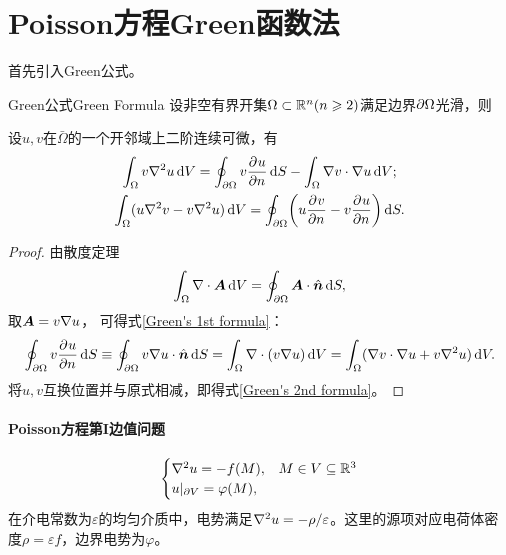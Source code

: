 \section{Poisson方程Green函数法}
首先引入Green公式。
\begin{theorem}{Green公式}{Green Formula}
	设非空有界开集$\Omega \subset \mathbb{R}^n(n \geqslant 2)$满足边界$\partial\Omega$光滑，则
	
	设$u,v$在$\bar\Omega$的一个开邻域上二阶连续可微，有
	\begin{gather}
		\label{Green's 1st formula}
		\int_\Omega v\nabla^2 u\mathop{}\!\mathrm{d} V = \oint_{\partial\Omega}v\frac{\partial^{}u}{\partial{n}^{}}\mathop{}\!\mathrm{d} S - \int_\Omega\nabla v \cdot \nabla u\mathop{}\!\mathrm{d} V;\\
		\label{Green's 2nd formula}
		\int_\Omega(u\nabla^2 v - v\nabla^2 u)\mathop{}\!\mathrm{d} V = \oint_{\partial\Omega}\biggl(u\frac{\partial^{}v}{\partial{n}^{}} - v\frac{\partial^{}u}{\partial{n}^{}}\biggr)\mathop{}\!\mathrm{d} S.
	\end{gather}
\end{theorem}
\begin{proof}
	由散度定理
	\begin{align*}
		\int_\Omega\nabla\cdot\bm A\mathop{}\!\mathrm{d} V = \oint_{\partial\Omega}\bm A \cdot \mathop{}\!\hat{\bm{n}}\mathop{}\!\mathrm{d} S,
	\end{align*}
	取$\bm A = v\nabla u$，
	可得式\eqref{Green's 1st formula}：
	\[
		\oint_{\partial\Omega}v\frac{\partial^{}u}{\partial{n}^{}}\mathop{}\!\mathrm{d} S \equiv \oint_{\partial\Omega}v\nabla u \cdot \mathop{}\!\hat{\bm{n}}\mathop{}\!\mathrm{d} S = \int_\Omega\nabla\cdot(v\nabla u)\mathop{}\!\mathrm{d} V = \int_\Omega(\nabla v \cdot \nabla u + v\nabla^2 u)\mathop{}\!\mathrm{d} V.
	\]
	将$u,v$互换位置并与原式相减，即得式\eqref{Green's 2nd formula}。
\end{proof}
\paragraph{Poisson方程第I边值问题}
\begin{align}
	\begin{cases}
		\nabla^2 u = -f(M),&M \in V \subseteq \mathbb{R}^3\\
		{u}\rvert_{\partial V} = \varphi(M),
	\end{cases}
\end{align}
在介电常数为$\varepsilon$的均匀介质中，电势满足$\nabla^2 u = -\rho/\varepsilon$。这里的源项对应电荷体密度$\rho = \varepsilon f$，边界电势为$\varphi$。

